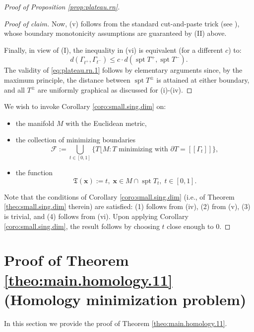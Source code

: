 \documentclass[11pt, letterpaper, reqno]{amsart}
\numberwithin{equation}{section}
\theoremstyle{remark}
\newcommand{\mbfx}{\mathbf{x}}
\newcommand{\frT}{\mathfrak{T}}
\newcommand{\spt}{\operatorname{spt}}
\newcommand{\llbracket}{[\![}
\newcommand{\rrbracket}{]\!]}
\newcommand{\mres}{\lfloor}
\begin{document}
\begin{proof}[Proof of Proposition \ref{prop:plateau.rn}]
\begin{proof}[Proof of claim]
	Now, (v) follows from the standard cut-and-paste trick (see \cite[Lemma 2.8]{CMS:generic.9.10}), whose boundary monotonicity assumptions are guaranteed by (II) above.

	Finally, in view of (I), the inequality in (vi) is equivalent (for a different $c$) to:
		\begin{equation} \label{eq:plateau.rn.1}
			d(\Gamma_{t^+}, \Gamma_{t^-}) \leq c \cdot d(\spt T^+, \spt T^-).
		\end{equation}
		The validity of \eqref{eq:plateau.rn.1} follows by elementary arguments since, by the maximum principle, the distance between $\spt T^\pm$ is attained at either boundary, and all $T^\pm$ are uniformly graphical as discussed for (i)-(iv).
	\end{proof}
	
	We wish to invoke Corollary \ref{coro:small.sing.dim} on:
	\begin{itemize}
		\item the manifold $M$ with the Euclidean metric,
		\item the collection of minimizing boundaries
		\[ \mathscr{F} := \bigcup_{t \in [0,1]} \{ T \mres M : T \text{ minimizing with } \partial T = \llbracket \Gamma_t \rrbracket \}, \]
		\item the function
		\[ \frT(\mbfx) := t, \; \mbfx \in M \cap \spt T_t, \; t \in [0, 1]. \]
	\end{itemize}
	Note that the conditions of Corollary \ref{coro:small.sing.dim} (i.e., of Theorem \ref{theo:small.sing.dim} therein) are satisfied: (1) follows from (iv), (2) from (v), (3) is trivial, and (4) follows from (vi). Upon applying Corollary \ref{coro:small.sing.dim}, the result follows by choosing $t$ close enough to $0$.
\end{proof}



\section{Proof of Theorem \ref{theo:main.homology.11} (Homology minimization problem)} \label{sec:homology.min}

In this section we provide the proof of Theorem \ref{theo:main.homology.11}. 
\end{document}
